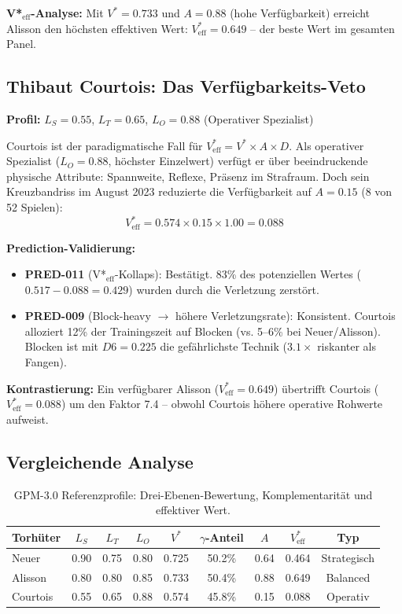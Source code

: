 \documentclass[12pt,a4paper]{article}
\begin{document}
\textbf{V*$_{\text{eff}}$-Analyse:} Mit $V^{*} = 0.733$ und $A = 0.88$ (hohe Verf\"ugbarkeit) erreicht Alisson den h\"ochsten effektiven Wert: $V^{*}_{\text{eff}} = 0.649$ -- der beste Wert im gesamten Panel.

\subsection{Thibaut Courtois: Das Verf\"ugbarkeits-Veto}
\label{sec:cs_courtois}

\textbf{Profil:} $L_S = 0.55$, $L_T = 0.65$, $L_O = 0.88$ (Operativer Spezialist)

Courtois ist der paradigmatische Fall f\"ur $V^{*}_{\text{eff}} = V^{*} \times A \times D$. Als operativer Spezialist ($L_O = 0.88$, h\"ochster Einzelwert) verf\"ugt er \"uber beeindruckende physische Attribute: Spannweite, Reflexe, Pr\"asenz im Strafraum. Doch sein Kreuzbandriss im August 2023 reduzierte die Verf\"ugbarkeit auf $A = 0.15$ (8 von 52 Spielen):
\[
V^{*}_{\text{eff}} = 0.574 \times 0.15 \times 1.00 = 0.088
\]

\textbf{Prediction-Validierung:}
\begin{itemize}
\item \textbf{PRED-011} (V*$_{\text{eff}}$-Kollaps): Best\"atigt. 83\% des potenziellen Wertes ($0.517 - 0.088 = 0.429$) wurden durch die Verletzung zerst\"ort.
\item \textbf{PRED-009} (Block-heavy $\rightarrow$ h\"ohere Verletzungsrate): Konsistent. Courtois alloziert 12\% der Trainingszeit auf Blocken (vs. 5--6\% bei Neuer/Alisson). Blocken ist mit $D6 = 0.225$ die gef\"ahrlichste Technik ($3.1\times$ riskanter als Fangen).
\end{itemize}

\textbf{Kontrastierung:} Ein verf\"ugbarer Alisson ($V^{*}_{\text{eff}} = 0.649$) \"ubertrifft Courtois ($V^{*}_{\text{eff}} = 0.088$) um den Faktor 7.4 -- obwohl Courtois h\"ohere operative Rohwerte aufweist.

\subsection{Vergleichende Analyse}
\label{sec:cs_vergleich}

\begin{table}[h]
\centering
\small
\begin{tabular}{lcccccccc}
\hline
\textbf{Torh\"uter} & $L_S$ & $L_T$ & $L_O$ & $V^{*}$ & $\gamma$-\textbf{Anteil} & $A$ & $V^{*}_{\text{eff}}$ & \textbf{Typ} \\
\hline
Neuer     & 0.90 & 0.75 & 0.80 & 0.725 & 50.2\% & 0.64 & 0.464 & Strategisch \\
Alisson   & 0.80 & 0.80 & 0.85 & 0.733 & 50.4\% & 0.88 & 0.649 & Balanced \\
Courtois  & 0.55 & 0.65 & 0.88 & 0.574 & 45.8\% & 0.15 & 0.088 & Operativ \\
\hline
\end{tabular}
\caption{GPM-3.0 Referenzprofile: Drei-Ebenen-Bewertung, Komplementarit\"at und effektiver Wert.}
\label{tab:referenzprofile}
\end{table}
\end{document}
